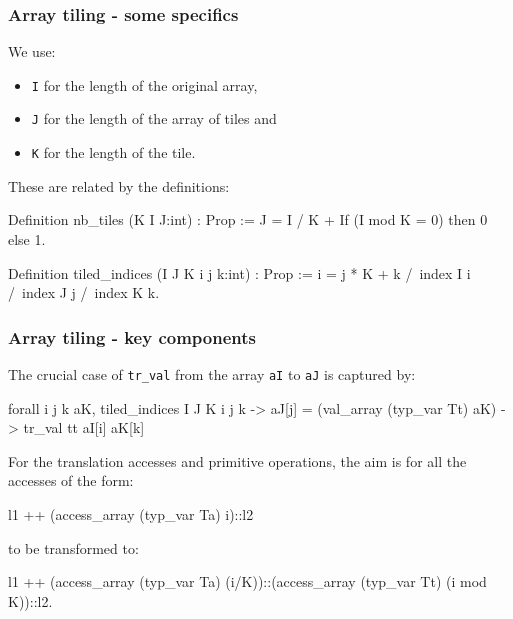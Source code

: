 \begin{frame}[fragile]
\frametitle{Array tiling - some specifics}

We use:
\begin{itemize}
	\item \texttt{I} for the length of the original array,
	\item \texttt{J} for the length of the array of tiles and
	\item \texttt{K} for the length of the tile.
\end{itemize}

\bigskip

These are related by the definitions:

\begin{coq}
  Definition nb_tiles (K I J:int) : Prop :=
    J = I / K + If (I mod K = 0) then 0 else 1.

  Definition tiled_indices (I J K i j k:int) : Prop :=
  		i = j * K + k
	/\	index I i
	/\	index J j
  	/\	index K k.
\end{coq}

\end{frame}


\begin{frame}[fragile]
\frametitle{Array tiling - key components}



The crucial case of \texttt{tr\_val} from the array \texttt{aI} to \texttt{aJ} is captured by:

\begin{coqs}
  forall i j k aK,			tiled_indices I J K i j k ->
				  aJ[j] = (val_array (typ_var Tt) aK) ->
				  tr_val tt aI[i] aK[k]
\end{coqs}

\bigskip \pause

For the translation accesses and primitive operations, the aim is for all the accesses of the form:

\begin{coqs}
  l1 ++ (access_array (typ_var Ta) i)::l2
\end{coqs}

to be transformed to:

\begin{coqs}
  l1 ++ (access_array (typ_var Ta) (i/K))::(access_array (typ_var Tt) (i mod K))::l2.
\end{coqs}

\end{frame}


